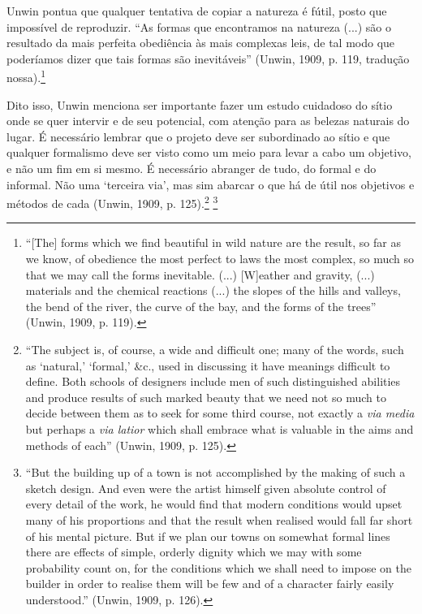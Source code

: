 \documentclass[12pt, a4paper]{book} %
\begin{document}
        Unwin pontua que qualquer tentativa de copiar a natureza é fútil, posto que impossível de reproduzir. ``As formas que encontramos na natureza (...) são o resultado da mais perfeita obediência às mais complexas leis, de tal modo que poderíamos dizer que tais formas são inevitáveis'' (Unwin, 1909, p. 119, tradução nossa).\footnote[21]{``[The] forms which we find beautiful in wild nature are the result, so far as we know, of obedience the most perfect to laws the most complex, so much so that we may call the forms inevitable. (...) [W]eather and gravity, (...) materials and the chemical reactions (...) the slopes of the hills and valleys, the bend of the river, the curve of the bay, and the forms of the trees'' (Unwin, 1909, p. 119).}

        Dito isso, Unwin menciona ser importante fazer um estudo cuidadoso do sítio onde se quer intervir e de seu potencial, com atenção para as belezas naturais do lugar. É necessário lembrar que o projeto deve ser subordinado ao sítio e que qualquer formalismo deve ser visto como um meio para levar a cabo um objetivo, e não um fim em si mesmo. É necessário abranger de tudo, do formal e do informal. Não uma `terceira via', mas sim abarcar o que há de útil nos objetivos e métodos de cada (Unwin, 1909, p. 125).\footnote[22]{``The subject is, of course, a wide and difficult one; many of the words, such as `natural,' `formal,' \&c., used in discussing it have meanings difficult to define. Both schools of designers include men of such distinguished abilities and produce results of such marked beauty that we need not so much to decide between them as to seek for some third course, not exactly a \textit{via media} but perhaps a \textit{via latior} which shall embrace what is valuable in the aims and methods of each'' (Unwin, 1909, p. 125).} 
        \footnote[23]{``But the building up of a town is not accomplished by the making of such a sketch design. And even were the artist himself given absolute control of every detail of the work, he would find that modern conditions would upset many of his proportions and that the result when realised would fall far short of his mental picture. But if we plan our towns on somewhat formal lines there are effects of simple, orderly dignity which we may with some probability count on, for the conditions which we shall need to impose on the builder in order to realise them will be few and of a character fairly easily understood.'' (Unwin, 1909, p. 126).}
\end{document}
